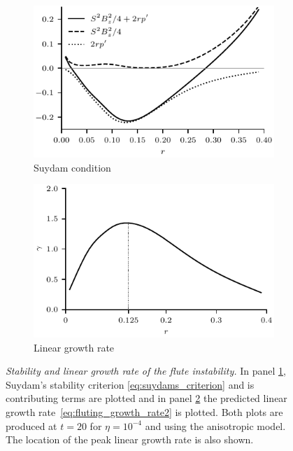 \documentclass[fleqn,usenatbib]{mnras}
\newcommand{\rs}[2]{{#2}}
\newcommand{\mycaption}[2]{\caption[#1]{\emph{#1} #2}}
\begin{document}
\begin{figure}
  \centering
    \begin{subfigure}{0.49\textwidth}
      \includegraphics[width=\linewidth]{suydam_condition_4.pdf}
      \caption{Suydam condition}
      \label{fig:suydam_condition_4}
    \end{subfigure}
    \hfill
    \begin{subfigure}{0.49\textwidth}
      \includegraphics[width=\linewidth]{growth_rate_4.pdf}
      \caption{Linear growth rate}
      \label{fig:growth_rate_4}
    \end{subfigure}
\mycaption{Stability and linear growth rate of the \rs{fluting}{flute}
  instability.}{In \rs{}{panel} \ref{fig:suydam_condition_4}, Suydam's stability
  criterion \rs{}{\eqref{eq:suydams_criterion}} and is contributing
  terms \rs{(LHS of~\eqref{eq:suydams_criterion})}{}  are plotted and in
  \rs{}{panel} \ref{fig:growth_rate_4} the predicted linear growth rate~\eqref{eq:fluting_growth_rate2} is plotted. Both plots are produced at $t=20$ for $\eta=10^{-4}$ and using the \rs{switching}{anisotropic} model. The location of the peak linear growth rate is also shown.}
\label{fig:stability_and_growth}%
\end{figure}
\end{document}
